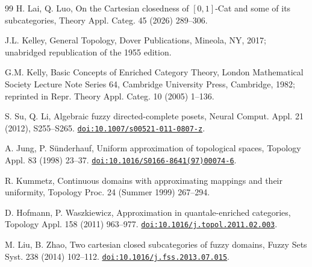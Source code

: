 \documentclass[preprint,3p,times]{elsarticle}
\theoremstyle{definition}
\theoremstyle{remark}
\numberwithin{equation}{section}
\begin{document}
\begin{thebibliography}{99}
H. Lai, Q. Luo,
On the Cartesian closedness of \([0,1]\)-Cat and some of its subcategories,
Theory Appl. Categ. 45 (2026) 289--306.

J.L. Kelley,
General Topology,
Dover Publications, Mineola, NY, 2017; unabridged republication of the 1955 edition.

G.M. Kelly,
Basic Concepts of Enriched Category Theory,
London Mathematical Society Lecture Note Series 64,
Cambridge University Press, Cambridge, 1982;
reprinted in Repr. Theory Appl. Categ. 10 (2005) 1--136.

S. Su, Q. Li,
Algebraic fuzzy directed-complete posets,
Neural Comput. Appl. 21 (2012), S255--S265.
\newblock
\href{https://doi.org/10.1007/s00521-011-0807-z}
{\nolinkurl{doi:10.1007/s00521-011-0807-z}}.



A. Jung, P. S\"underhauf,
Uniform approximation of topological spaces,
Topology Appl. 83 (1998) 23--37.
\newblock \href{https://doi.org/10.1016/S0166-8641(97)00074-6}{\nolinkurl{doi:10.1016/S0166-8641(97)00074-6}}.

R. Kummetz,
Continuous domains with approximating mappings and their uniformity,
Topology Proc. 24 (Summer 1999) 267--294.

D. Hofmann, P. Waszkiewicz,
Approximation in quantale-enriched categories,
Topology Appl. 158 (2011) 963--977.
\newblock \href{https://doi.org/10.1016/j.topol.2011.02.003}{\nolinkurl{doi:10.1016/j.topol.2011.02.003}}.

M. Liu, B. Zhao,
Two cartesian closed subcategories of fuzzy domains,
Fuzzy Sets Syst. 238 (2014) 102--112.
\newblock \href{https://doi.org/10.1016/j.fss.2013.07.015}{\nolinkurl{doi:10.1016/j.fss.2013.07.015}}.

\end{thebibliography}
\endgroup
\end{document}
